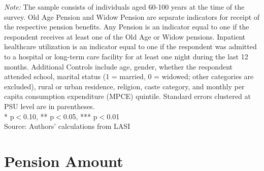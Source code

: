 \documentclass[
  11pt,
]{article}
\begin{document}
\begin{landscape}
\begin{table}[H]
\begin{minipage}{0.95\textwidth}
\footnotesize \textit{Note:} The sample consists of individuals aged 60-100 years at the time of the survey. Old Age Pension and Widow Pension are separate indicators for receipt of the respective pension benefits. Any Pension is an indicator equal to one if the respondent receives at least one of the Old Age or Widow pensions. Inpatient healthcare utilization is an indicator equal to one if the respondent was admitted to a hospital or long-term care facility for at least one night during the last 12 months. Additional Controls include age, gender, whether the respondent attended school, marital status (1 = married, 0 = widowed; other categories are excluded), rural or urban residence, religion, caste category, and monthly per capita consumption expenditure (MPCE) quintile. Standard errors clustered at PSU level are in parentheses. \\ * p$<$0.10, ** p$<$0.05, *** p$<$0.01\\
Source: Authors' calculations from LASI
\end{minipage}
\end{table}
\end{landscape}

\section{Pension Amount}\label{pension-amount}
\end{document}
